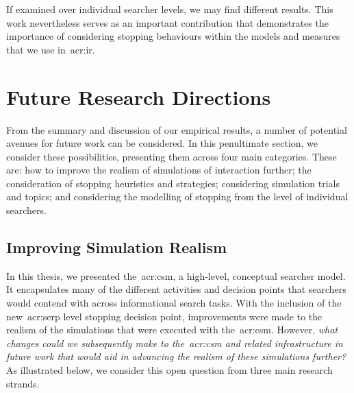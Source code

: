If examined over individual searcher levels, we may find different results. This work nevertheless serves as an important contribution that demonstrates the importance of considering stopping behaviours within the models and measures that we use in~\gls{acr:ir}.

\section{Future Research Directions}\label{sec:conclusions:future}
From the summary and discussion of our empirical results, a number of potential avenues for future work can be considered. In this penultimate section, we consider these possibilities, presenting them across four main categories. These are: how to improve the realism of simulations of interaction further; the consideration of stopping heuristics and strategies; considering simulation trials and topics; and considering the modelling of stopping from the level of individual searchers.

\subsection{Improving Simulation Realism}\label{sec:conclusions:future:improving}
In this thesis, we presented the~\gls{acr:csm}, a high-level, conceptual searcher model. It encapsulates many of the different activities and decision points that searchers would contend with across informational search tasks. With the inclusion of the new~\gls{acr:serp} level stopping decision point, improvements were made to the realism of the simulations that were executed with the~\gls{acr:csm}. However, \emph{what changes could we subsequently make to the~\gls{acr:csm} and related infrastructure in future work that would aid in advancing the realism of these simulations further?} As illustrated below, we consider this open question from three main research strands.

\begin{figure}[h!]
    \centering
\end{figure}

